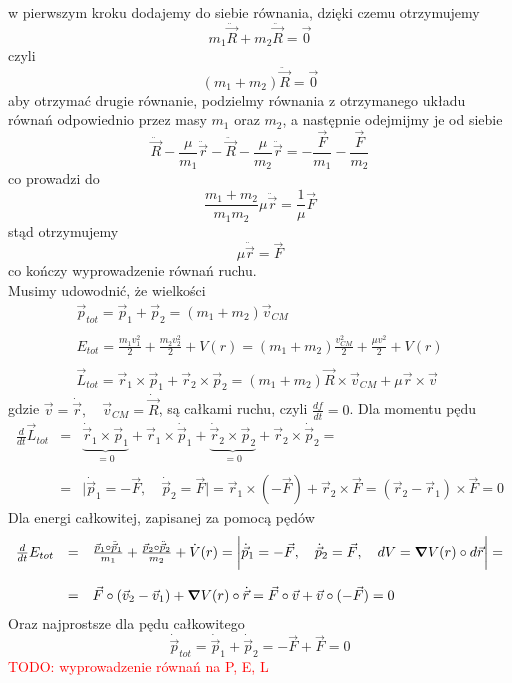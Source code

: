 \documentclass[a4paper,12pt]{article}
\newcommand\myworries[1]{\textcolor{red}{#1}} %
\begin{document}
	w pierwszym kroku dodajemy do siebie równania, dzięki czemu otrzymujemy
		$$
			m_1\ddot{\vec{R}} + m_2\ddot{\vec{R}} = \vec{0}
		$$
	czyli
		$$
			(m_1+m_2)\ddot{\vec{R}} = \vec{0}
		$$
	aby otrzymać drugie równanie, podzielmy równania z otrzymanego układu równań odpowiednio przez masy $m_1$ oraz $m_2$, a następnie odejmijmy je od siebie
		$$
			\ddot{\vec{R}} - \frac{\mu}{m_1}\ddot{\vec{r}} - \ddot{\vec{R}} - \frac{\mu}{m_2}\ddot{\vec{r}} = -\frac{\vec{F}}{m_1} - \frac{\vec{F}}{m_2}
		$$
	co prowadzi do
		$$
		\frac{m_1+m_2}{m_1 m_2}\mu \ddot{\vec{r}} = \frac{1}{\mu} \vec{F}
		$$
	stąd otrzymujemy
		$$
		\mu\ddot{\vec{r}} = \vec{F}
		$$
	co kończy wyprowadzenie równań ruchu.\\
	Musimy udowodnić, że wielkości
		$$
		\begin{array}{l}
			\vec{p}_{tot} = \vec{p}_1+\vec{p}_2=(m_1+m_2)\vec{v}_{CM}\\\\
			E_{tot} = \frac{m_1 v_1^2}{2}+\frac{m_2 v_2^2}{2} + V(r) = (m_1+m_2)\frac{v_{CM}^2}{2}+\frac{\mu v^2}{2} + V(r)\\\\
			\vec{L}_{tot} = \vec{r}_1\times\vec{p}_1 + \vec{r}_2\times\vec{p}_2 =  (m_1+m_2)\vec{R}\times\vec{v}_{CM}+\mu\vec{r}\times\vec{v}
		\end{array}
		$$
	gdzie $\vec{v}=\dot{\vec{r}},\quad \vec{v}_{CM} = \dot{\vec{R}}$, są
	całkami ruchu, czyli $\frac{d f}{dt}=0$. Dla momentu pędu
	$$
	\begin{array}{lll}
		\frac{d}{dt}\vec{L}_{tot} &=& \underbrace{\dot{\vec{r}}_1 \times\vec{p}_1}_{=0} + \vec{r}_1\times\dot{\vec{p}}_1 + \underbrace{\dot{\vec{r}}_2 \times\vec{p}_2}_{=0} + \vec{r}_2\times\dot{\vec{p}}_2 = \\\\
		&=&\bigg\vert \dot{\vec{p}}_1 = -\vec{F}, \quad \dot{\vec{p}}_2 = \vec{F} \bigg\vert = \vec{r}_1\times(-\vec{F})+\vec{r}_2\times\vec{F} = (\vec{r}_2-\vec{r}_1)\times \vec{F} = 0
	\end{array}
	$$
	Dla energi całkowitej, zapisanej za pomocą pędów 
	$$
	\begin{array}{lll}
		\frac{d}{dt}E_{tot} & = & \frac{\vec{p}_1\circ\ddot{\vec{p}}_1}{m_1} + \frac{\vec{p}_2\circ\ddot{\vec{p}}_2}{m_2} + \dot{V}(r) =
		\bigg\vert \dot{\vec{p}}_1 = -\vec{F}, \quad \dot{\vec{p}}_2 = \vec{F},\quad dV = \grad{V(r)}\circ d\vec{r} \bigg\vert =\\\\
		&=& \vec{F}\circ(\vec{v}_2-\vec{v}_1) + \grad{V(r)}\circ\dot{\vec{r}} = \vec{F}\circ \vec{v} + \vec{v}\circ(-\vec{F}) = 0
	\end{array}
	$$
	Oraz najprostsze dla pędu całkowitego
	$$
	\dot{\vec{p}}_{tot} = \dot{\vec{p}}_1 + \dot{\vec{p}}_2 = -\vec{F}+\vec{F} = 0
	$$
  \myworries{TODO: wyprowadzenie równań na P, E, L}
\end{document}
